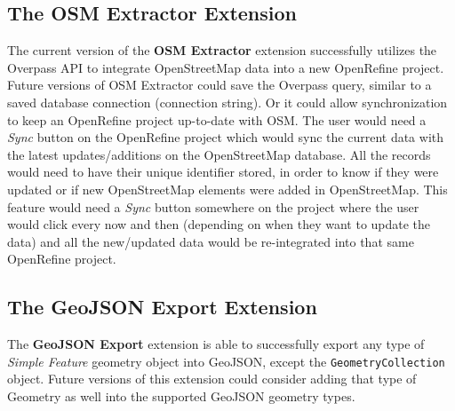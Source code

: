 \subsection{The OSM Extractor Extension}
The current version of the \textbf{OSM Extractor} extension successfully utilizes the Overpass API to integrate OpenStreetMap data into a new OpenRefine project. Future versions of OSM Extractor could save the Overpass query, similar to a saved database connection (connection string). Or it could allow synchronization to keep an OpenRefine
project up-to-date with OSM. The user would need a \textit{Sync} button on the OpenRefine project which would sync the current data with the latest updates/additions on the OpenStreetMap database. All the records would need to have their unique identifier stored, in order to know if they were updated or if new OpenStreetMap elements were added in OpenStreetMap. This feature would need a \textit{Sync} button somewhere on the project
where the user would click every now and then (depending on when they want to update the data) and all the new/updated data would be re-integrated into that same OpenRefine project.
\subsection{The GeoJSON Export Extension}
The \textbf{GeoJSON Export} extension is able to successfully export any type of \textit{Simple Feature} geometry object into GeoJSON, except the \texttt{GeometryCollection} object.
Future versions of this extension could consider adding that type of Geometry as well into the supported GeoJSON geometry types.